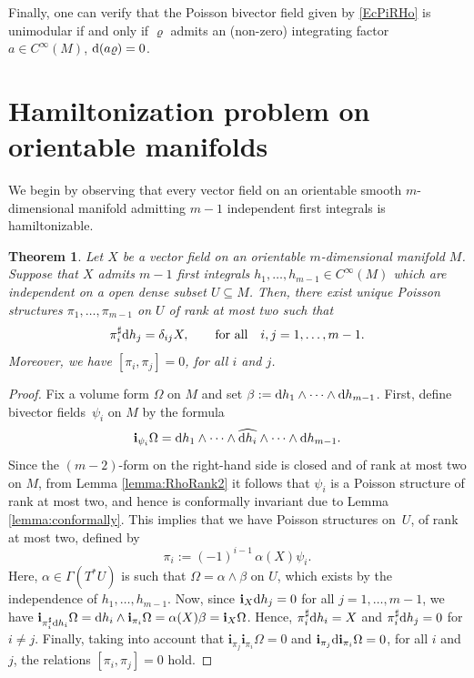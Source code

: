 \documentclass[pdftex]{sigma}%
\newcommand{\dd}{{\rm d}}
\newcommand{\ii}{\mathbf{i}}
\numberwithin{equation}{section}
\newtheorem{Theorem}{Theorem}[section]
\begin{document}
Finally, one can verify that the Poisson bivector field given by \eqref{EcPiRHo} is unimodular if and only if $\varrho$ admits an (non-zero) integrating factor $a \in C^{\infty}(M)$, $\dd(a\varrho)=0$.

\section{Hamiltonization problem on orientable manifolds}
 \label{sec:Hamiltonization problem on orientable manifolds}

We begin by observing that every vector field on an orientable smooth $m$-dimensional manifold admitting $m-1$ independent first integrals is hamiltonizable.

\begin{Theorem}\label{teo:IntegrableHam}
Let $X$ be a vector field on an orientable $m$-dimensional manifold $M$. Suppose that $X$ admits $m-1$ first integrals $h_1, \dots, h_{m-1} \in C^{\infty}(M)$ which are independent on a open dense subset $U \subseteq M$. Then, there exist unique Poisson structures $\pi_{1}, \dots, \pi_{m-1}$ on $U$ of rank at most two such that
 \begin{equation}\label{HamX}
 \pi_{i}^{\sharp}\dd h_{j} = \delta_{ij}X, \qquad \text{for all} \quad i,j = 1, \dots, m-1.
 \end{equation}
Moreover, we have $[\pi_{i},\pi_{j}]=0$, for all $i$ and $j$.
\end{Theorem}
\begin{proof}
Fix a volume form $\Omega$ on $M$ and set $\beta := \dd h_1 \wedge \cdots \wedge \dd h_{m-1}$. First, define bivector fields~$\psi_{i}$ on $M$ by the formula
 \begin{equation}\label{eq:Psi-i}
 \ii_{\psi_{i}}\Omega = \dd h_{1} \wedge \cdots \wedge \widehat{\dd h_{i}} \wedge \cdots \wedge \dd h_{m-1}.
 \end{equation}
Since the $(m-2)$-form on the right-hand side is closed and of rank at most two on $M$, from Lemma \ref{lemma:RhoRank2} it follows that $\psi_{i}$ is a Poisson structure of rank at most two, and hence is conformally invariant due to Lemma \ref{lemma:conformally}. This implies that we have Poisson structures on~$U$, of rank at most two, defined by
 \begin{equation}\label{eq:Pi-i}
 \pi_{i} := (-1)^{i-1}\,\alpha(X)\psi_{i}.
 \end{equation}
Here, $\alpha\in\Gamma(T^*U)$ is such that $\Omega = \alpha \wedge \beta$ on $U$, which exists by the independence of $h_1,\dots,h_{m-1}$. Now, since $\ii_X\dd h_j=0$ for all $j=1,\dots,m-1$, we have $\ii_{\pi_{i}^{\sharp}\dd h_{i}}\Omega = \dd h_{i}\wedge\ii_{\pi_{i}}\Omega = \alpha(X)\beta = \ii_{X}\Omega$. Hence, $\pi_{i}^{\sharp}\dd h_{i} = X$ and $\pi_{i}^{\sharp}\dd h_{j} = 0$ for $i \neq j$. Finally, taking into account that $\ii_{\pi_{j}}\ii_{\pi_{i}}\Omega = 0$ and $\ii_{\pi_{j}}\dd\ii_{\pi_{i}}\Omega = 0$, for all $i$ and $j$, the relations $[\pi_{i},\pi_{j}] = 0$ hold.
\end{proof}
\end{document}
